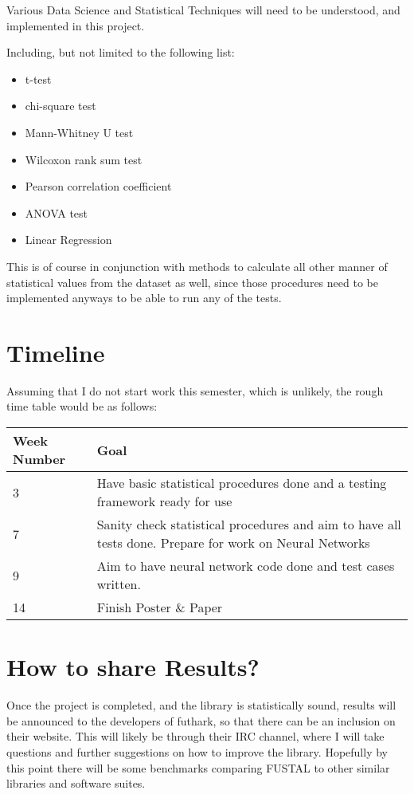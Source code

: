 \documentclass{article}
\begin{document}
Various Data Science and Statistical Techniques will need to be understood,
and implemented in this project.

Including, but not limited to the following list:

\begin{itemize}
\item t-test
\item chi-square test
\item Mann-Whitney U test
\item Wilcoxon rank sum test
\item Pearson correlation coefficient
\item ANOVA test
\item Linear Regression
\end{itemize}

This is of course in conjunction with methods to calculate all other manner
of statistical values from the dataset as well, since those procedures
need to be implemented anyways to be able to run any of the tests.

\section{Timeline}

Assuming that I do not start work this semester, which is unlikely, the rough time table would be as follows:

\begin{center}
\begin{tabular}{p{.2\linewidth}|p{.6\linewidth}}
Week Number & Goal\\
\hline
3 & Have basic statistical procedures done and a testing framework ready for use\\
7 & Sanity check statistical procedures and aim to have all tests done. Prepare for work on Neural Networks\\
9 & Aim to have neural network code done and test cases written.\\
14 & Finish Poster \& Paper\\
\end{tabular}
\end{center}

\section{How to share Results?}

Once the project is completed, and the library is statistically sound, results
will be announced to the developers of futhark, so that there can be an inclusion
on their website. This will likely be through their IRC channel, where I will
take questions and further suggestions on how to improve the library. Hopefully
by this point there will be some benchmarks comparing FUSTAL to other similar
libraries and software suites.
\end{document}

